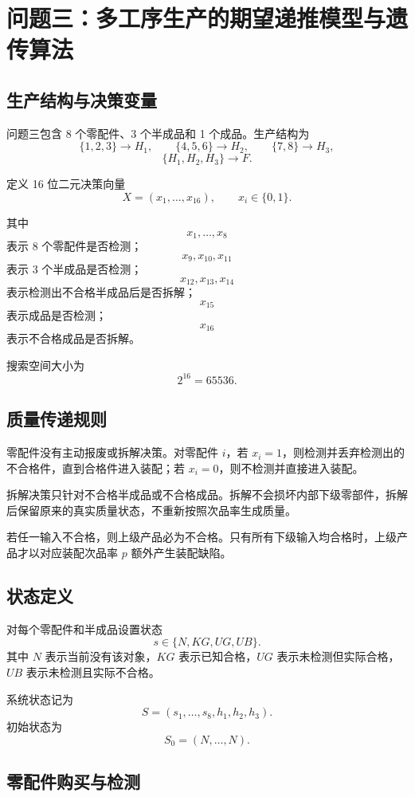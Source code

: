 
\section{问题三：多工序生产的期望递推模型与遗传算法}

\subsection{生产结构与决策变量}

问题三包含 8 个零配件、3 个半成品和 1 个成品。生产结构为
\[
\{1,2,3\}\rightarrow H_1,\qquad
\{4,5,6\}\rightarrow H_2,\qquad
\{7,8\}\rightarrow H_3,
\]
\[
\{H_1,H_2,H_3\}\rightarrow F.
\]

定义 16 位二元决策向量
\[
X=(x_1,\ldots,x_{16}),\qquad x_i\in\{0,1\}.
\]

其中
\[
x_1,\ldots,x_8
\]
表示 8 个零配件是否检测；
\[
x_9,x_{10},x_{11}
\]
表示 3 个半成品是否检测；
\[
x_{12},x_{13},x_{14}
\]
表示检测出不合格半成品后是否拆解；
\[
x_{15}
\]
表示成品是否检测；
\[
x_{16}
\]
表示不合格成品是否拆解。

搜索空间大小为
\[
2^{16}=65536.
\]

\subsection{质量传递规则}

零配件没有主动报废或拆解决策。对零配件 \(i\)，若 \(x_i=1\)，则检测并丢弃检测出的不合格件，直到合格件进入装配；若 \(x_i=0\)，则不检测并直接进入装配。

拆解决策只针对不合格半成品或不合格成品。拆解不会损坏内部下级零部件，拆解后保留原来的真实质量状态，不重新按照次品率生成质量。

若任一输入不合格，则上级产品必为不合格。只有所有下级输入均合格时，上级产品才以对应装配次品率 \(p\) 额外产生装配缺陷。

\subsection{状态定义}

对每个零配件和半成品设置状态
\[
s\in\{N,KG,UG,UB\}.
\]
其中 \(N\) 表示当前没有该对象，\(KG\) 表示已知合格，\(UG\) 表示未检测但实际合格，\(UB\) 表示未检测且实际不合格。

系统状态记为
\[
S=(s_1,\ldots,s_8,h_1,h_2,h_3).
\]
初始状态为
\[
S_0=(N,\ldots,N).
\]

\subsection{零配件购买与检测}

